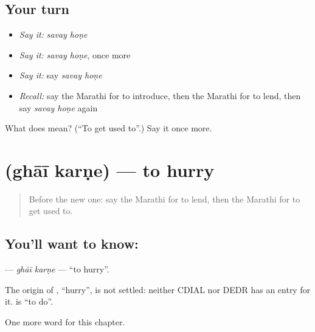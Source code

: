 \subsection*{Your turn}
\begin{itemize}
\raggedright
  \item \emph{Say it:} \emph{savay hoṇe}
  \item \emph{Say it:} \emph{savay hoṇe}, once more
  \item \emph{Say it:} say \emph{savay hoṇe}
  \item \emph{Recall:} say the Marathi for to introduce, then the Marathi for to lend, then say \emph{savay hoṇe} again
\end{itemize}

\begin{tcolorbox}[breakable,colback=teal!4,colframe=teal!35!black,title={Before you move on}]
What does   mean? (\textquotedblleft{}To get used to\textquotedblright{}.) Say it once more.
\end{tcolorbox}
\section[\texorpdfstring{\mr{घाई} \mr{करणे} (ghāī karṇe)}{घाई करणे (ghāī karṇe)}]{  (ghāī karṇe) — to hurry}

\label{lesson:MR-C197-ghai-karne}



\begin{quote}
Before the new one: say the Marathi for to lend, then the Marathi for to get used to.
\end{quote}

\subsection*{You'll want to know:  }
\textbf{ } — \emph{ghāī karṇe} — \textquotedblleft{}to hurry\textquotedblright{}.

\begin{cousinweb}
The origin of \textbf{}, \textquotedblleft{}hurry\textquotedblright{}, is not settled: neither CDIAL nor DEDR has an entry for it. \textbf{} is \textquotedblleft{}to do\textquotedblright{}.
\end{cousinweb}

\begin{grammarlens}[title={What you've built}]
One more word for this chapter.
\end{grammarlens}

